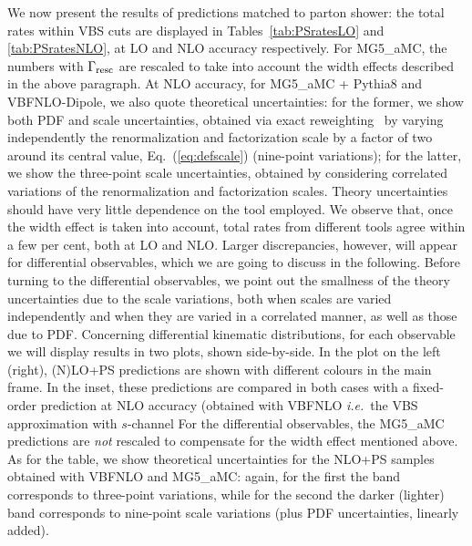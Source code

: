 We now present the results of predictions matched to parton shower: the total rates within VBS cuts are displayed in Tables~\ref{tab:PSratesLO} and
\ref{tab:PSratesNLO}, at LO and NLO
accuracy respectively. For {\sc MG5\_aMC}, 
the numbers with $\Gamma_{\rm resc}$ are rescaled to 
take into account the width effects described in the above paragraph. At NLO accuracy, for {\sc MG5\_aMC} + {\sc Pythia8} and {\sc VBFNLO}-{\sc Dipole}, we also quote
theoretical uncertainties: for the former, we show both PDF and scale uncertainties, obtained via exact reweighting~\cite{Frederix:2011ss} by varying independently the renormalization and factorization
scale by a factor of two around its central value, Eq.~(\ref{eq:defscale}) (nine-point variations); for the latter, we show the 
three-point scale uncertainties, obtained by considering correlated variations of the renormalization and factorization scales. Theory uncertainties should have very little dependence on the tool employed.
We observe that, once the width effect is taken into
account, total rates from different tools agree within a few per cent, both at LO and NLO. Larger discrepancies, however, will appear for differential observables, which we are going to discuss in
the following. Before turning to the differential observables, we point out the smallness of the theory uncertainties due to the scale variations, both when
scales are varied independently and when they are varied in a correlated manner, as well as those due to PDF.  
Concerning differential kinematic distributions, for each observable we will display results in two plots, shown side-by-side. In the plot on the left (right), (N)LO+PS predictions are shown
with different colours in the main frame. In the inset, these predictions are compared in both cases with a fixed-order prediction at NLO accuracy (obtained with
{\sc VBFNLO} \emph{i.e.}\ the VBS approximation with $s$-channel  For the differential observables, the {\sc MG5\_aMC} predictions are \emph{not} rescaled to compensate for the width effect mentioned above. As for the table, we show theoretical uncertainties for the NLO+PS samples
obtained with {\sc VBFNLO} and {\sc MG5\_aMC}: 
again, for the first the band corresponds to three-point variations, while for the second the darker (lighter) band corresponds to nine-point 
scale variations (plus PDF uncertainties, linearly added). 

